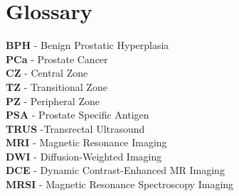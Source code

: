 \chapter*{Glossary}


\markboth{\MakeUppercase{\nomname}}{\MakeUppercase{\nomname}}



%
%


\begin{multicols}{2} %
\begin{footnotesize} %

\textbf{BPH} - Benign Prostatic Hyperplasia \\

\textbf{PCa} - Prostate Cancer \\

\textbf{CZ} - Central Zone \\

\textbf{TZ} - Transitional Zone \\

\textbf{PZ} - Peripheral Zone \\

\textbf{PSA} - Prostate Specific Antigen \\

\textbf{TRUS} -Transrectal Ultrasound \\

\textbf{MRI} - Magnetic Resonance Imaging \\

\textbf{DWI} - Diffusion-Weighted Imaging \\

\textbf{DCE} - Dynamic Contrast-Enhanced MR Imaging \\

\textbf{MRSI} - Magnetic Resonance Spectroscopy Imaging \\

\label{nom} %

\end{footnotesize}
\end{multicols}